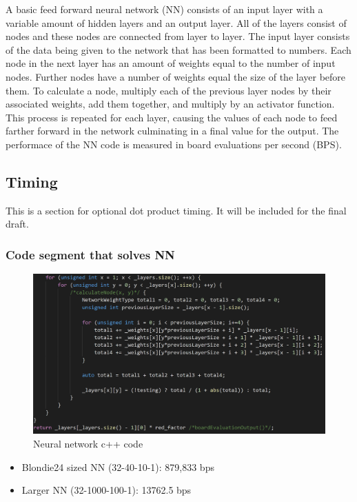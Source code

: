 \documentclass{article}
\begin{document}
A basic feed forward neural network (NN) consists of an input layer
with a variable amount of hidden layers and an output layer. All of the layers
consist of nodes and these nodes are connected from layer to layer. The input
layer consists of the data being given to the network that has been formatted
to numbers. Each node in the next layer has an amount of weights equal to the
number of input nodes. Further nodes have a number of weights equal the size of
the layer before them. To calculate a node, multiply each of the previous layer
nodes by their associated weights, add them together, and multiply by an
activator function. This process is repeated for each layer, causing the values
of each node to feed farther forward in the network culminating in a final
value for the output. The performace of the NN code is measured in board evaluations per
second (BPS).

\subsection{Timing}
This is a section for optional dot product timing. It
will be included for the final draft.

\subsubsection{Code segment that solves NN}

\begin{figure}
    \includegraphics[width=\linewidth]{images/nn-code.png}
    \caption{Neural network c++ code}
    \label{fig:nn-code}
\end{figure}

\begin{itemize}
    \item Blondie24 sized NN (32-40-10-1): 879,833 bps
    \item Larger NN (32-1000-100-1): 13762.5 bps
\end{itemize}
\end{document}
